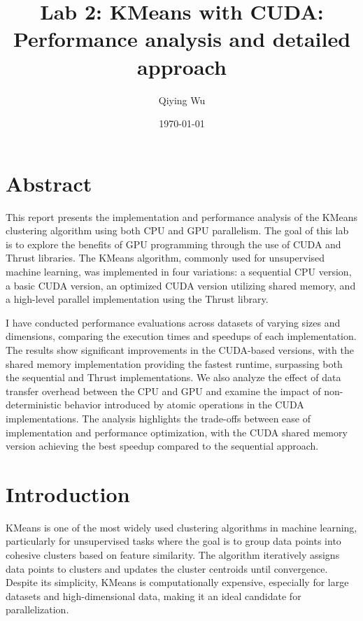 \documentclass[letterpaper,12pt]{article}
\theoremstyle{remark}
\begin{document}
\title{Lab 2: KMeans with CUDA: \\
\large 
Performance analysis and detailed approach
   }


\date{\today}
\author{Qiying Wu}
\maketitle





\section*{Abstract }

 This report presents the implementation and performance analysis of the KMeans clustering algorithm using both CPU and GPU parallelism. The goal of this lab is to explore the benefits of GPU programming through the use of CUDA and Thrust libraries. The KMeans algorithm, commonly used for unsupervised machine learning, was implemented in four variations: a sequential CPU version, a basic CUDA version, an optimized CUDA version utilizing shared memory, and a high-level parallel implementation using the Thrust library.

I have conducted performance evaluations across datasets of varying sizes and dimensions, comparing the execution times and speedups of each implementation. The results show significant improvements in the CUDA-based versions, with the shared memory implementation providing the fastest runtime, surpassing both the sequential and Thrust implementations. We also analyze the effect of data transfer overhead between the CPU and GPU and examine the impact of non-deterministic behavior introduced by atomic operations in the CUDA implementations. The analysis highlights the trade-offs between ease of implementation and performance optimization, with the CUDA shared memory version achieving the best speedup compared to the sequential approach. 


\section*{Introduction }
KMeans is one of the most widely used clustering algorithms in machine learning, particularly for unsupervised tasks where the goal is to group data points into cohesive clusters based on feature similarity. The algorithm iteratively assigns data points to clusters and updates the cluster centroids until convergence. Despite its simplicity, KMeans is computationally expensive, especially for large datasets and high-dimensional data, making it an ideal candidate for parallelization.
\end{document}
